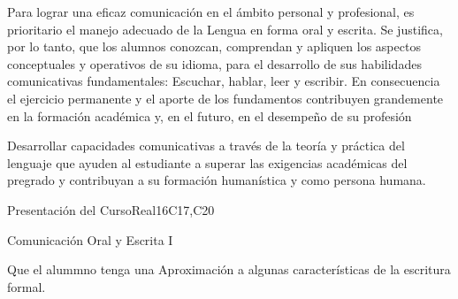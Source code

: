 \begin{syllabus}


\begin{justification}
Para lograr una eficaz comunicación en el ámbito personal y profesional, es prioritario el manejo adecuado de la Lengua en forma oral y escrita. Se justifica, por lo tanto, que los alumnos  conozcan, comprendan y apliquen los aspectos conceptuales y operativos de su idioma, para el desarrollo de sus habilidades comunicativas fundamentales: Escuchar, hablar, leer y escribir.
En consecuencia el ejercicio permanente y el aporte de los fundamentos contribuyen grandemente en la formación académica y, en el futuro, en el desempeño de su profesión
\end{justification}

\begin{goals}
\item Desarrollar capacidades comunicativas a través de la teoría y práctica del lenguaje que ayuden al estudiante a superar las exigencias académicas del pregrado y contribuyan a su formación humanística y como persona humana.
\end{goals}

\begin{outcomes}
   \item {}
   \item {}
   \item {}
\end{outcomes}

\begin{competences}
    \item {}
    \item {}
    \item {}
\end{competences}

\begin{unit}{Presentación del Curso}{}{Real}{16}{C17,C20}
  \begin{topics}
      \item Comunicación Oral y Escrita I
  \end{topics}

  \begin{learningoutcomes}
   \item Que el alummno tenga una Aproximación a algunas características de la escritura formal.
  \end{learningoutcomes}
\end{unit}


\end{syllabus}
